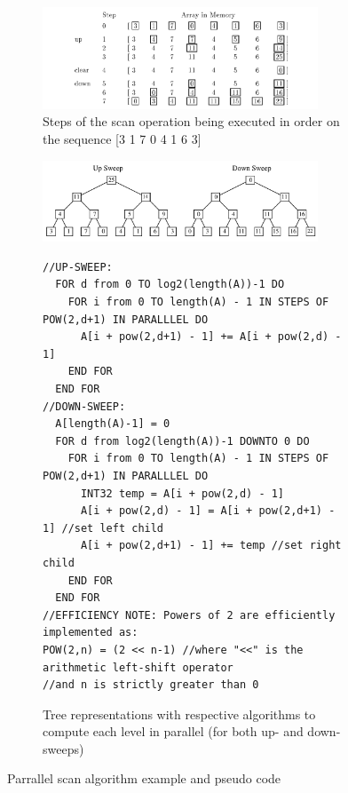  \begin{figure}[h!]
    \centering
    \begin{subfigure}[b]{0.8\textwidth}
      \includegraphics[width=0.9\textwidth]{scanOperationOnArray.png}
      \caption{Steps of the scan operation being executed in order on the sequence [3 1 7 0 4 1 6 3]}
      \label{UPSWEEP_DOWNSWEEP}
    \end{subfigure}
    \begin{subfigure}[b]{\textwidth}
      \centering
      \includegraphics[width=0.9\textwidth]{upsweep_downsweep.png}
      \begin{minipage}{\textwidth}
        \begin{verbatim}
//UP-SWEEP:
  FOR d from 0 TO log2(length(A))-1 DO
    FOR i from 0 TO length(A) - 1 IN STEPS OF POW(2,d+1) IN PARALLLEL DO
      A[i + pow(2,d+1) - 1] += A[i + pow(2,d) - 1]
    END FOR
  END FOR
//DOWN-SWEEP:
  A[length(A)-1] = 0
  FOR d from log2(length(A))-1 DOWNTO 0 DO
    FOR i from 0 TO length(A) - 1 IN STEPS OF POW(2,d+1) IN PARALLLEL DO
      INT32 temp = A[i + pow(2,d) - 1]
      A[i + pow(2,d) - 1] = A[i + pow(2,d+1) - 1] //set left child
      A[i + pow(2,d+1) - 1] += temp //set right child
    END FOR
  END FOR
//EFFICIENCY NOTE: Powers of 2 are efficiently implemented as:
POW(2,n) = (2 << n-1) //where "<<" is the arithmetic left-shift operator
//and n is strictly greater than 0
        \end{verbatim}       
      \end{minipage}
      \caption{Tree representations with respective algorithms to compute each level in parallel (for both up- and down-sweeps)}
      \label{PARALLEL_SCAN_SUB_ALGORITHMS}
    \end{subfigure}
    \caption{Parrallel scan algorithm example and pseudo code \cite{blelloch1990prefix}}
    \label{PARALLEL_SCAN}
  \end{figure}
  

